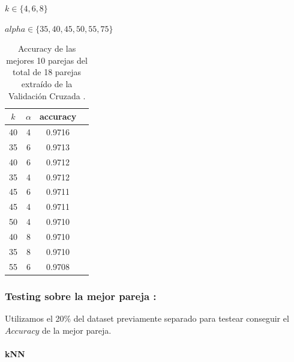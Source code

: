 $ k \in \{4,6,8\}$
\par
$alpha \in \{  35, 40, 45, 50, 55, 75 \}$
\begin{table}[h!]
    \begin{center}
        \begin{tabular}{|c|c|c|c|}
        \hline
        \textbf{$k$} & \textbf{$\alpha$} & \textbf{accuracy} \\
        \hline
        40 & 4 & 0.9716\\
        35 & 6 & 0.9713\\
        40 & 6 & 0.9712\\
        35 & 4 & 0.9712\\
        45 & 6 & 0.9711\\
        45 & 4 & 0.9711\\
        50 & 4 & 0.9710\\
        40 & 8 & 0.9710\\
        35 & 8 & 0.9710\\
        55 & 6 & 0.9708\\
        
        \hline
        \end{tabular}
        \caption{Accuracy de las mejores 10 parejas del total de 18 parejas extraído de la Validación Cruzada .}
        \label{knnpca_crossVal_table}

    \end{center}
\end{table}

\subsubsection{ Testing sobre la mejor pareja : }


Utilizamos el 20$\%$ del dataset previamente separado para testear conseguir el $Accuracy$ de la mejor pareja.

\paragraph{kNN}

